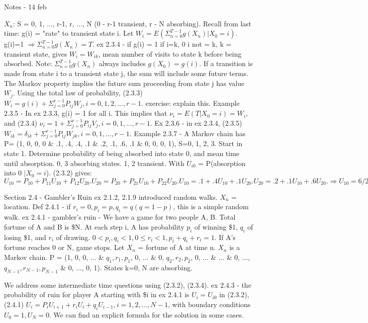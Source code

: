 \documentclass{article}
\begin{document}
Notes - 14 feb

$X_n$: S = {0, 1, ..., r-1, r, ..., N} (0 - r-1 transient, r - N absorbing).
Recall from last time: g(i) = "rate" to transient state i.
Let $W_i = E ( \Sigma_{n=0}^{T-1} g(X_n)|X_0=i)$. g(i)=1 $\Rightarrow \Sigma_{n=0}^{T-1}g(X_n)=T$.
ex 2.3.4 - if g(i) = 1 if i=k, 0 i not = k, k = transient state, gives $W_i = W_{ik}$, mean number of visits to state k before being absorbed.
Note: $\Sigma_{n=0}^{T-1}g(X_n)$ always includes $g(X_0)=g(i)$.
If a transition is made from state i to a transient state j, the sum will include some future terms. The Markov property implies the future sum proceeding from state j has value $W_j$.
Using the total law of probability, (2.3.3) $W_i = g(i) + \Sigma_{j=0}^{r-1}P_{ij}W_j, i=0, 1, 2, ..., r-1$.
exercise: explain this.
Example 2.3.5 - In ex 2.3.3, g(i) = 1 for all i. This implies that $\nu_i = E(T|X_0=i)=W_i$, and (2.3.4) $\nu_i = 1 + \Sigma_{j=0}^{r-1}P_{ij}V_j, i=0, 1, ..., r-1$.
Ex 2.3.6 - in ex 2.3.4, (2.3.5) $W_{ik} = \delta_{ik} + \Sigma_{j=0}^{r-1}P_{ij}W_{jk}, i=0, 1, ..., r-1$.
Example 2.3.7 - A Markov chain has P= (1, 0, 0, 0 \& .1, .4, .4, .1 \& .2, .1, .6, .1 \& 0, 0, 0, 1), S={0, 1, 2, 3}. Start in state 1. Determine probability of being absorbed into state 0, and mean time until absorption. 0, 3 absorbing states. 1, 2 transient. With $U_{i0}$ = P(absorption into 0 $| X_0 = i$). (2.3.2) gives: $U_{10} = P_{10} + P_{11}U_{10} + P_{12}U_{20}. U_{20} = P_{20} + P_{21}U_{10} + P_{22}U_{20}. U_{10} = .1 + .4 U_{10} + .1 U_{20}. U_{20} = .2 + .1 U_{10} + .6 U_{20}. \Rightarrow U_{10} = 6/23, U_{20} = 13/23. (2.3.4) \nu_1 = 1 + .4 \nu_1 + .1 \nu_2. \nu_2 = 1 + .1 \nu_1 + .6 \nu_2. \Rightarrow \nu_1 = 50/23, \nu_2 = 70/23.$

Section 2.4 - Gambler's Ruin
ex 2.1.2, 2.1.9 introduced random walks. $X_n$ = location.
Def 2.4.1 - if $r_i = 0, p_i = p, q_i = q (q = 1-p)$, this is a simple random walk.
ex 2.4.1 - gambler's ruin - We have a game for two people A, B. Total fortune of A and B is \$N. At each step i, A has probability $p_i$ of winning \$1, $q_i$ of losing \$1, and $r_i$ of drawing. $0 < p_i, q_i < 1, 0 \le r_i < 1, p_i + q_i + r_i = 1$. If A's fortune reaches 0 or N, game stops. Let $X_n$ = fortune of A at time n. $X_n$ is a Markov chain. P = (1, 0, 0, ... \& $q_1, r_1, p_1$, 0, ... \& 0, $q_2, r_2, p_2$, 0, ... \& ... \& 0, ..., $q_{N-1}, r_{N-1}, p_{N-1}$ \& 0, ..., 0, 1). States k=0, N are absorbing.

We address some intermediate time questions using (2.3.2), (2.3.4).
ex 2.4.3 - the probability of ruin for player A starting with \$i in ex 2.4.1 is $U_i = U_{i0}$ in (2.3.2), (2.4.1) $U_i = P_i U_{i+1} + r_i U_i + q_i U_{i-1}, i=1, 2, ..., N-1$, with boundary conditions $U_0 = 1, U_N = 0$. We can find an explicit formula for the solution in some cases.
\end{document}

